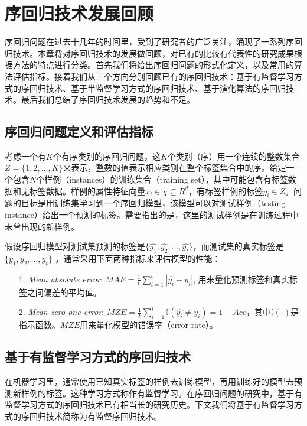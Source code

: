 \chapter{序回归技术发展回顾}
\label{chap:review}

序回归问题在过去十几年的时间里，受到了研究者的广泛关注，涌现了一系列序回归技术。本章将对序回归技术的发展做回顾，对已有的比较有代表性的研究成果根据方法的特点进行分类。首先我们将给出序回归问题的形式化定义，以及常用的算法评估指标。接着我们从三个方向分别回顾已有的序回归技术：基于有监督学习方式的序回归技术、基于半监督学习方式的序回归技术、基于演化算法的序回归技术。最后我们总结了序回归技术发展的趋势和不足。

\section{序回归问题定义和评估指标}
考虑一个有\(K\)个有序类别的序回归问题，这\(K\)个类别（序）用一个连续的整数集合 \(Z=\{1,2,\dots,K\}\)来表示，整数的值表示相应类别在整个标签集合中的序。给定一个包含\(N\)个样例（instances）的训练集合（training set），其中可能包含有标签数据和无标签数据。样例的属性特征向量\(x_{i} \in \chi \subseteq R^{d}\)，有标签样例的标签\(y_{i} \in Z\)。问题的目标是用训练集学习到一个序回归模型，该模型可以对测试样例（testing instance）给出一个预测的标签。需要指出的是，这里的测试样例是在训练过程中未曾出现的新样例。


假设序回归模型对测试集预测的标签是\(\{\hat{y_{1}},\hat{y_{2}},\dots,\hat{y_{t}}\}\)，而测试集的真实标签是 \(\{y_{1},y_{2},\dots,y_{t}\}\) ，通常采用下面两种指标来评估模型的性能：
\begin{enumerate}
\item[1.] \textit{Mean absolute error}: \(MAE=\frac{1}{t}\sum_{i=1}^{t}|\hat{y_{i}}-y_{i}|\), 用来量化预测标签和真实标签之间偏差的平均值。
\item[2.] \textit{Mean zero-one error}: \(MZE=\frac{1}{t}\sum_{i=1}^{t}\mathbb{I}(\hat{y_{i}}\neq y_{i}) = 1-Acc\)，其中\(\mathbb{I}(\cdot)\)是指示函数。\(MZE\)用来量化模型的错误率（error rate）。
\end{enumerate}

\section{基于有监督学习方式的序回归技术}
在机器学习里，通常使用已知真实标签的样例去训练模型，再用训练好的模型去预测新样例的标签。这种学习方式称作有监督学习。在序回归问题的研究中，基于有监督学习方式的序回归技术已有相当长的研究历史。下文我们将基于有监督学习方式的序回归技术简称为有监督序回归技术。

